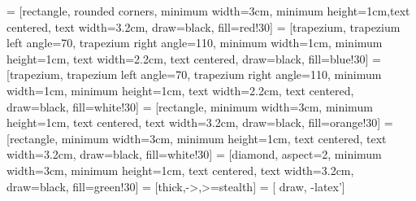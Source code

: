 \usepackage{graphicx}		%
\usepackage[utf8]{inputenc}
\usepackage[T1]{fontenc}

\usepackage{amsmath}		
\usepackage{amsfonts}
\usepackage{amssymb}
\usepackage{bm}
\usepackage{appendix}

\usepackage[margin=1in]{geometry}

\usepackage{booktabs}

\usepackage{xcolor}
\usepackage{color}

\usepackage{tikz}
\usetikzlibrary{shapes.geometric, arrows,fit}


\usepackage{hyperref}

\newcommand{\horrule}[1]{\rule{\linewidth}{#1}}
\newcommand{\tab}{\hspace*{3em}}


 = [rectangle, rounded corners, minimum width=3cm, minimum height=1cm,text centered, text width=3.2cm, draw=black, fill=red!30]
 = [trapezium, trapezium left angle=70, trapezium right angle=110, minimum width=1cm, minimum height=1cm, text width=2.2cm, text centered, draw=black, fill=blue!30]
 = [trapezium, trapezium left angle=70, trapezium right angle=110, minimum width=1cm, minimum height=1cm, text width=2.2cm, text centered, draw=black, fill=white!30]
 = [rectangle, minimum width=3cm, minimum height=1cm, text centered, text width=3.2cm, draw=black, fill=orange!30]
 = [rectangle, minimum width=3cm, minimum height=1cm, text centered, text width=3.2cm, draw=black, fill=white!30]
 = [diamond, aspect=2, minimum width=3cm, minimum height=1cm, text centered, text width=3.2cm, draw=black, fill=green!30]
 = [thick,->,>=stealth]
 = [ draw, -latex'] 
